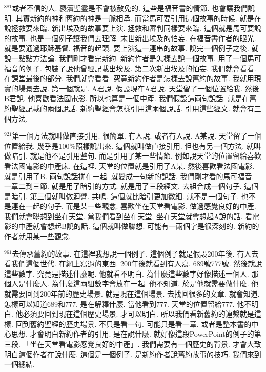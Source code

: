 \documentclass{book}
\begin{document}
$^{881}$或者不信的人.
褻瀆聖靈是不會被赦免的.
這些是福音書的情節.
也會讓我們說明.
其實新約的神和舊約的神是一脈相承.
而當馬可要引用這個故事的時候.
就是在說拯救要來臨.
新出埃及的故事要上演.
拯救和審判同樣要來臨.
這個就是馬可要說的故事.
也是一個例子讓我們去理解.
末世新出埃及的怕妄.
在福音書作者的眼光.
就是要通過耶穌基督.
福音的起頭.
要上演這一連串的故事.
說完一個例子之後.
就說一點點方法論.
我們剛才看完新約.
新約作者是怎樣去說一個故事.
用了一個馬可福音的例子.
包裝了說他曾經記載出埃及.
第二次新出埃及的怕妄.
我們就會看看.
在課堂最後的部分.
我們就會看看.
究竟新約作者是怎樣去說舊約的故事.
我就用現實的場景去說.
第一個就是.
A君說.
假設現在A君說.
天堂留了一個位置給我.
然後B君說.
他喜歡看法國電影.
所以也算是一個中產.
我們假設這兩句說話.
就是在舊約聖經記載的兩個說話.
新約聖經會怎樣引用這兩個說話.
引用這些經文.
就會有三個方法.

$^{921}$第一個方法就叫做直接引用.
很簡單.
有人說.
或者有人說.
A某說.
天堂留了一個位置給我.
幾乎是100\%照樣說出來.
這個就叫做直接引用.
但也有另一個方法.
就叫做暗引.
就是他不是引用整句.
而是引用了某一些情節.
例如說天堂的位置留給喜歡看法國電影的中產床.
在這裡.
天堂的位置就是引用了A某.
然後喜歡看法國電影.
就是引用了B.
兩句說話拼在一起.
就變成一句新的說話.
我們剛才看的馬可福音.
一章二到三節.
就是用了暗引的方式.
就是用了三段經文.
去組合成一個句子.
這個是暗引.
第三個就叫做迴響.
共鳴.
這個就比暗引更加微細.
就不是一個句子.
也不是連在一起的句子.
而是某一些觀念.
喜歡坐在天堂看電影.
做過感覺良好的中產.
我們就會聯想到坐在天堂.
當我們看到坐在天堂.
坐在天堂就會想起A說的話.
看電影的中產就會想起B說的話.
這個就叫做聯想.
可能有一兩個字是很深刻的.
新約的作者就用某一些觀念.

$^{961}$去傳承舊約的故事.
在這裡我想說一個例子.
這個例子就是假設200年後.
有人去看我們這個世代.
在網上寫過的東西.
200年後就看到有人寫.
689號777號.
然後就說這些數字.
究竟是描述什麼呢.
他就看不明白.
為什麼這些數字好像描述一個人.
那個人是什麼人.
為什麼這兩組數字會放在一起.
他不知道.
於是他就需要做什麼.
他就需要回到200年前的歷史場景.
就是現在這個場景.
去找回很多的文章.
就會知道.
怎樣可以知道689和777.
是在解釋什麼.
當他看到777.
天堂的位置留給777.
他不明白.
他必須要回到現在這個歷史場景.
才可以明白.
所以我們看新舊約的連繫就是這樣.
回到舊約聖經的歷史場景.
不只是看一句.
可能只是看一章.
或者是整本書的中心思想.
才會明白新約作者的引用.
是在說什麼.
就好像這段PowerPoint的例子的第三段.
「坐在天堂看電影感覺良好的中產」.
我們需要有一個歷史的背景.
才會大致明白這個作者在說什麼.
這個是一個例子.
是新約作者說舊約故事的技巧.
我們來到一個總結.
\end{document}
